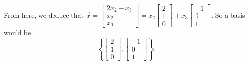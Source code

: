 \begin{enumerate}
		From here, we deduce that \(\vec{x} = \begin{bmatrix}2x_2 - x_3 \\ x_2 \\ x_3\end{bmatrix} = x_2\begin{bmatrix}2 \\ 1\\ 0\end{bmatrix} + x_3\begin{bmatrix}-1 \\ 0\\ 1\end{bmatrix}\). So a basis would be \[\left\{\begin{bmatrix}2 \\ 1\\ 0\end{bmatrix}, \begin{bmatrix}-1 \\ 0\\ 1\end{bmatrix}\right\}.\]
\end{enumerate}
